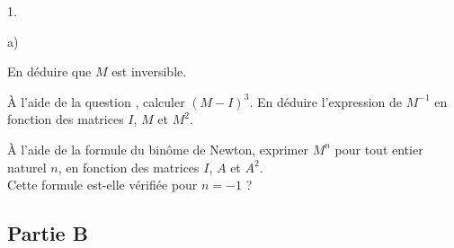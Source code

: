 \documentclass[11pt]{article}%
\begin{document}
\begin{noliste}{1.}
\begin{noliste}{a)}
  \item En déduire que $M$ est inversible.
    
  \item À l'aide de la question , calculer $(M-I)^3$. En
    déduire l'expression de $M^{-1}$ en fonction des matrices $I$, $M$
    et $M^2$.
    
  \item À l'aide de la formule du binôme de Newton, exprimer $M^n$ pour 
    tout entier naturel $n$, en fonction des matrices $I$, $A$ et $A^2$.\\
    Cette formule est-elle vérifiée pour $n=-1$ ?
  \end{noliste}
\end{noliste}




\subsection*{Partie B} 
\end{document}
